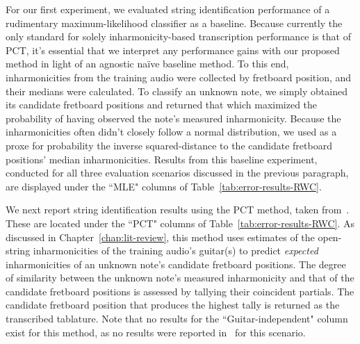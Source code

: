 \documentclass[12pt]{cmuthesis}
\begin{document}
For our first experiment, we evaluated string identification performance of a rudimentary maximum-likelihood classifier as a baseline. Because currently the only standard for solely inharmonicity-based transcription performance is that of PCT, it's essential that we interpret any performance gains with our proposed method in light of an agnostic na\"ive baseline method. To this end, inharmonicities from the training audio were collected by fretboard position, and their medians were calculated. To classify an unknown note, we simply obtained its candidate fretboard positions and returned that which maximized the probability of having observed the note's measured inharmonicity. Because the inharmonicities often didn't closely follow a normal distribution, we used as a proxe for probability the inverse squared-distance to the candidate fretboard positions' median inharmonicities. Results from this baseline experiment, conducted for all three evaluation scenarios discussed in the previous paragraph, are displayed under the ``MLE" columns of Table~\ref{tab:error-results-RWC}.

We next report string identification results using the PCT method, taken from~\cite{barbanchoi2012}. These are located under the ``PCT" columns of Table~\ref{tab:error-results-RWC}. As discussed in Chapter~\ref{chap:lit-review}, this method uses estimates of the open-string inharmonicities of the training audio's guitar(s) to predict \textit{expected} inharmonicities of an unknown note's candidate fretboard positions. The degree of similarity between the unknown note's measured inharmonicity and that of the candidate fretboard positions is assessed by tallying their coincident partials. The candidate fretboard position that produces the highest tally is returned as the transcribed tablature. Note that no results for the ``Guitar-independent" column exist for this method, as no results were reported in~\cite{barbanchoi2012} for this scenario.
\end{document}
